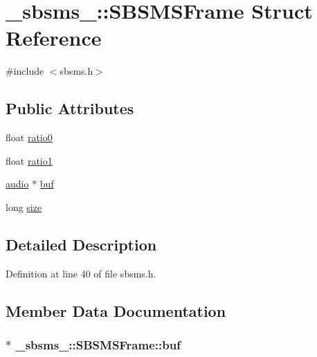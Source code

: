 \hypertarget{struct__sbsms___1_1_s_b_s_m_s_frame}{}\section{\+\_\+sbsms\+\_\+\+:\+:S\+B\+S\+M\+S\+Frame Struct Reference}
\label{struct__sbsms___1_1_s_b_s_m_s_frame}


{\ttfamily \#include $<$sbsms.\+h$>$}

\subsection*{Public Attributes}
\begin{DoxyCompactItemize}
\item 
float \hyperlink{struct__sbsms___1_1_s_b_s_m_s_frame_ac8e9101334b82a87c959efff3a1629b0}{ratio0}
\item 
float \hyperlink{struct__sbsms___1_1_s_b_s_m_s_frame_a37e83c5b5514f5f03e7dda5848d4318e}{ratio1}
\item 
\hyperlink{namespace__sbsms___a11786cc5bd221ff534972ae350477324}{audio} $\ast$ \hyperlink{struct__sbsms___1_1_s_b_s_m_s_frame_a9d7b111419ece643b28d69ac342d3021}{buf}
\item 
long \hyperlink{struct__sbsms___1_1_s_b_s_m_s_frame_a18247bf48653e54f978a72b5e8a568a5}{size}
\end{DoxyCompactItemize}


\subsection{Detailed Description}


Definition at line 40 of file sbsms.\+h.



\subsection{Member Data Documentation}
\subsubsection[{\texorpdfstring{buf}{buf}}]{$\ast$ \+\_\+sbsms\+\_\+\+::\+S\+B\+S\+M\+S\+Frame\+::buf}\hypertarget{struct__sbsms___1_1_s_b_s_m_s_frame_a9d7b111419ece643b28d69ac342d3021}{}\label{struct__sbsms___1_1_s_b_s_m_s_frame_a9d7b111419ece643b28d69ac342d3021}


